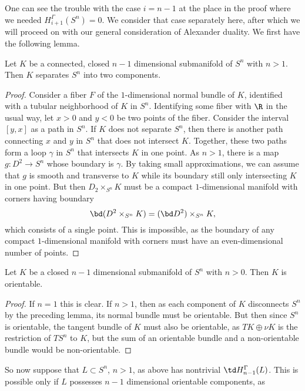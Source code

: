 \begin{example}
One can see the trouble with the case $i = n-1$ at the place in the proof where we needed $H_{i+1}^\Gamma (S^n) = 0$.
We consider that case separately here, after which we will proceed on with our general consideration of Alexander duality.
We first have the following lemma.

\begin{lemma}
	Let $K$ be a connected, closed $n-1$ dimensional submanifold of $S^n$ with $n>1$.
	Then $K$ separates $S^n$ into two components.
\end{lemma}
\begin{proof}
	Consider a fiber $F$ of the $1$-dimensional normal bundle of $K$, identified with a tubular neighborhood of $K$ in $S^n$.
	Identifying some fiber with $\R$ in the usual way, let $x >0$ and $y < 0$ be two points of the fiber.
	Consider the interval $[y,x]$ as a path in $S^n$.
	If $K$ does not separate $S^n$, then there is another path connecting $x$ and $y$ in $S^n$ that does not intersect $K$.
	Together, these two paths form a loop $\gamma$ in $S^n$ that intersects $K$ in one point.
	As $n>1$, there is a map $g \colon D^2 \to S^n$ whose boundary is $\gamma$.
	By taking small approximations, we can assume that $g$ is smooth and transverse to $K$ while its boundary still only intersecting $K$ in one point.
	But then $D_2 \times_{S^n} K$ must be a compact $1$-dimensional manifold with corners having boundary $$\bd (D^2 \times_{S^n} K) = (\bd D^2) \times_{S^n} K,$$
	which consists of a single point.
	This is impossible, as the boundary of any compact $1$-dimensional manifold with corners must have an even-dimensional number of points.
\end{proof}

\begin{corollary}\label{C: codim 1 oriented}
	Let $K$ be a closed $n-1$ dimensional submanifold of $S^n$ with $n>0$.
	Then $K$ is orientable.
\end{corollary}
\begin{proof}
	If $n=1$ this is clear.
	If $n>1$, then as each component of $K$ disconnects $S^n$ by the preceding lemma, its normal bundle must be orientable.
	But then since $S^n$ is orientable, the tangent bundle of $K$ must also be orientable, as $TK \oplus \nu K$ is the restriction of $TS^n$ to $K$, but the sum of an orientable bundle and a non-orientable bundle would be non-orientable.
\end{proof}



So now suppose that $L \subset S^n$, $n>1$, as above has nontrivial $\td H_{n-1}^\Gamma(L)$.
This is possible only if $L$ possesses $n-1$ dimensional orientable components, as


\end{example}
